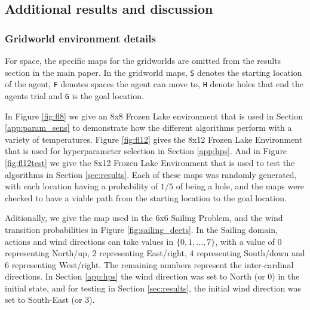 \subsection{Additional results and discussion} \label{app:additional_results}

    \FloatBarrier
    




    \subsubsection{Gridworld environment details} \label{app:env_deets}
        
        For space, the specific maps for the gridworlds are omitted from the results section in the main paper. In the gridworld maps, \texttt{S} denotes the starting location of the agent, \texttt{F} denotes spaces the agent can move to, \texttt{H} denote holes that end the agents trial and \texttt{G} is the goal location. 
        
        In Figure \ref{fig:fl8} we give an 8x8 Frozen Lake environment that is used in Section \ref{app:param_sens} to demonstrate how the different algorithms perform with a variety of temperatures. Figure \ref{fig:fl12} gives the 8x12 Frozen Lake Environment that is used for hyperparameter selection in Section \ref{app:hps}. And in Figure \ref{fig:fl12test} we give the 8x12 Frozen Lake Environment that is used to test the algorithms in Section \ref{sec:results}. Each of these maps was randomly generated, with each location having a probability of $1/5$ of being a hole, and the maps were checked to have a viable path from the starting location to the goal location.

        Aditionally, we give the map used in the 6x6 Sailing Problem, and the wind transition probabilities in Figure \ref{fig:sailing_deets}. In the Sailing domain, actions and wind directions can take values in $\{0,1,...,7\}$, with a value of $0$ representing North/up, $2$ representing East/right, $4$ representing South/down and $6$ representing West/right. The remaining numbers represent the inter-cardinal directions. In Section \ref{app:hps} the wind direction was set to North (or $0$) in the initial state, and for testing in Section \ref{sec:results}, the initial wind direction was set to South-East (or $3$).
    
